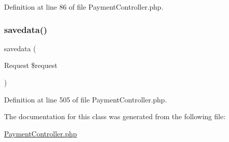 Definition at line 86 of file Payment\+Controller.\+php.

\mbox{\label{class_responsive_1_1_http_1_1_controllers_1_1_payment_controller_a39992cc1c190dd16b2de573a70a7f5dc}} 
\subsubsection{\texorpdfstring{savedata()}{savedata()}}
{\footnotesize\ttfamily savedata (\begin{DoxyParamCaption}\item[{Request}]{\$request }\end{DoxyParamCaption})\hspace{0.3cm}{\ttfamily [protected]}}



Definition at line 505 of file Payment\+Controller.\+php.



The documentation for this class was generated from the following file\+:\begin{DoxyCompactItemize}
\item 
\mbox{\hyperlink{_payment_controller_8php}{Payment\+Controller.\+php}}\end{DoxyCompactItemize}
